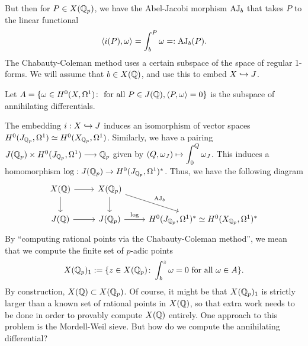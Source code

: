 But then for $P \in X(\mathbb{Q}_p)$, we have the Abel-Jacobi morphism $\operatorname{AJ}_b$ that takes $P$ to the linear functional
	\[
	\langle i(P), \omega \rangle= \int_b^P \omega =: \operatorname{AJ}_b(P).
	\]
The Chabauty-Coleman method uses a certain subspace of the space of regular 1-forms. We will assume that $b \in X(\mathbb{Q})$, and use this to embed $X \hookrightarrow J$.


\begin{dfn}
Let $A= \{ \omega \in H^0(X, \Omega^1) \colon \text{ for all } P \in J(\mathbb{Q}), \langle P, \omega \rangle= 0 \}$ is the subspace of annihilating differentials.  
\end{dfn}


The embedding $i: X \hookrightarrow J$ induces an isomorphism of vector spaces $H^0(J_{\mathbb{Q}_p}, \Omega^1) \simeq H^0(X_{\mathbb{Q}_p}, \Omega^1)$. Similarly, we have a pairing $J(\mathbb{Q}_p) \times H^0(J_{\mathbb{Q}_p}, \Omega^1) \stackrel{}{\longrightarrow} \mathbb{Q}_p$ given by $\displaystyle (Q, \omega_J) \mapsto \int_0^Q \omega_J$. This induces a homomorphism $\log: J(\mathbb{Q}_p) \to H^0(J_{\mathbb{Q}_p}, \Omega^1)^*$. Thus, we have the following diagram
	\[
	\begin{tikzcd}
	X(\Q) \arrow{d} \arrow{r} & X(\Qp) \arrow{d} \arrow{dr}{\abj_b} \\
	J(\Q) \arrow{r} & J(\Qp) \arrow{r}{\log} &  H^0(J_{\Qp},\Omega^1)^* \simeq H^0(X_{\Qp}, \Omega^1)^*
	\end{tikzcd}
	\]
By ``computing rational points via the Chabauty-Coleman method'', we mean that we compute the finite set of $p$-adic points
	\[
	X(\mathbb{Q}_p)_1:= \{ z \in X(\mathbb{Q}_p) \colon \int_b^z \omega= 0 \text{ for all } \omega \in A \}.
	\]
By construction, $X(\mathbb{Q}) \subset X(\mathbb{Q}_p)$. Of course, it might be that $X(\mathbb{Q}_p)_1$ is strictly larger than a known set of rational points in $X(\mathbb{Q})$, so that extra work needs to be done in order to provably compute $X(\mathbb{Q})$ entirely. One approach to this problem is the Mordell-Weil sieve. But how do we compute the annihilating differential? 


